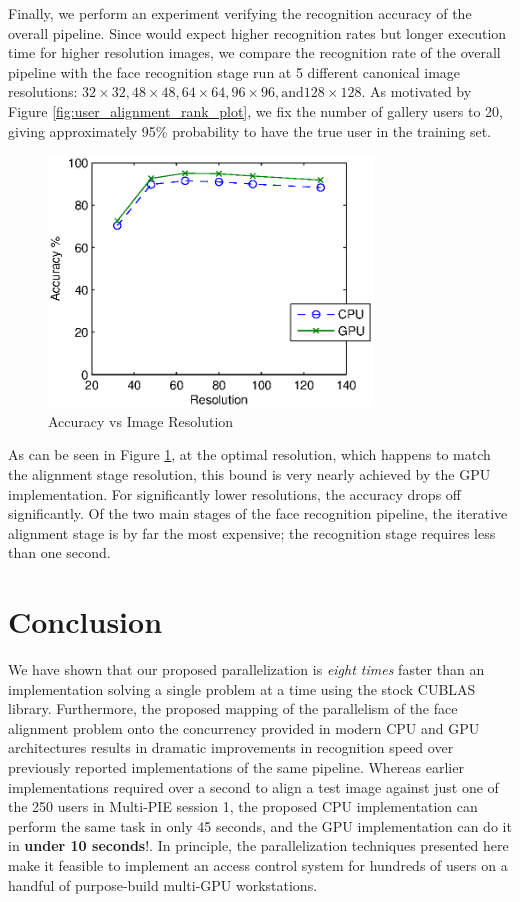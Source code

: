 \documentclass[10pt,twocolumn,letterpaper]{article}
\begin{document}
Finally, we perform an experiment verifying the recognition accuracy of the
overall pipeline.  Since would expect higher recognition rates but longer
execution time for higher resolution images, we compare the recognition rate of
the overall pipeline with the face recognition stage run at 5 different
canonical image resolutions: $32\times32, 48 \times 48, 64 \times 64, 96 \times
96, \textrm{and} 128 \times 128$.  As motivated by Figure
\ref{fig:user_alignment_rank_plot}, we fix the number of gallery users to 20,
giving approximately 95\% probability to have the true user in the training
set.  
\begin{figure}
\centering
\includegraphics[width=3.4in]{figures/accuracyVsResolution}
\caption{Accuracy vs Image Resolution}
\label{fig:accuracy_vs_resolution}
\end{figure}
As can be seen in Figure \ref{fig:accuracy_vs_resolution}, at the optimal
resolution, which happens to match the alignment stage resolution, this bound
is very nearly achieved by the GPU implementation.  For significantly lower
resolutions, the accuracy drops off significantly.  Of the two main stages of
the face recognition pipeline, the iterative alignment stage is by far the most
expensive; the recognition stage requires less than one second.

\section{Conclusion}
We have shown that our proposed parallelization is {\em eight times} faster
than an implementation solving a single problem at a time using the stock
CUBLAS library. Furthermore, the proposed mapping of the parallelism of the
face alignment problem onto the concurrency provided in modern CPU and GPU
architectures results in dramatic improvements in recognition speed over
previously reported implementations of the same pipeline.  Whereas earlier
implementations required over a second to align a test image against just one
of the 250 users in Multi-PIE session 1, the proposed CPU implementation can
perform the same task in only 45 seconds, and the GPU implementation can do it
in {\bf under 10 seconds}!.  In principle, the parallelization techniques
presented here make it feasible to implement an access control system for
hundreds of users on a handful of purpose-build multi-GPU workstations.


{\small


}
\end{document}
